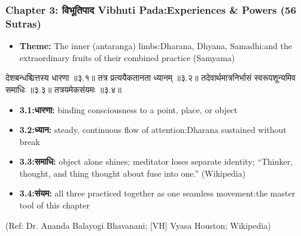 \begin{frame}[fragile]\frametitle{Chapter 3: विभूतिपाद Vibhuti Pada:Experiences \& Powers (56 Sutras)}

\begin{itemize}
\item \textbf{Theme:} The inner (antaranga) limbs:Dharana, Dhyana, Samadhi:and the extraordinary fruits of their combined practice (Samyama)
\end{itemize}

\begin{sanskrit}
देशबन्धश्चित्तस्य धारणा ॥३.१॥
तत्र प्रत्ययैकतानता ध्यानम् ॥३.२॥
तदेवार्थमात्रनिर्भासं स्वरूपशून्यमिव समाधिः ॥३.३॥
तत्रयमेकसंयमः ॥३.४॥
\end{sanskrit}

\begin{itemize}
\item \textbf{3.1:धारणा:} binding consciousness to a point, place, or object
\item \textbf{3.2:ध्यान:} steady, continuous flow of attention:Dharana sustained without break
\item \textbf{3.3:समाधि:} object alone shines; meditator loses separate identity; ``Thinker, thought, and thing thought about fuse into one.'' (Wikipedia)
\item \textbf{3.4:संयम:} all three practiced together as one seamless movement:the master tool of this chapter
\end{itemize}

\tiny{(Ref: Dr. Ananda Balayogi Bhavanani; [VH] Vyasa Houston; Wikipedia)}

\end{frame}

